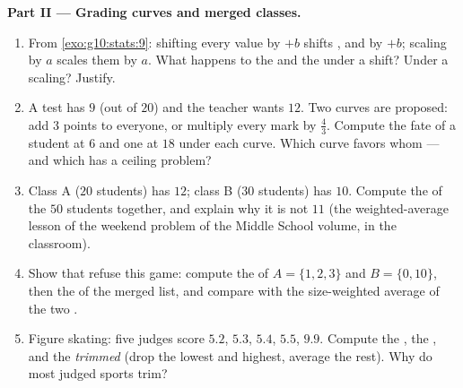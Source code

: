 \begin{problem}
\medskip
\noindent\textbf{Part II --- Grading curves and merged classes.}
\begin{enumerate}[resume]
  \item From \cref{exo:g10:stats:9}: shifting every value by
        $+b$ shifts ,  and  by $+b$; scaling
        by $a$ scales them by $a$. What happens to the  and
        the  under a shift? Under a scaling?
        Justify.
  \item A test has  $9$ (out of $20$) and the teacher wants
         $12$. Two curves are proposed: add $3$ points to
        everyone, or multiply every mark by $\frac43$. Compute
        the fate of a student at $6$ and one at $18$ under each
        curve. Which curve favors whom --- and which has a
        ceiling problem?
  \item Class A ($20$ students) has  $12$; class B ($30$
        students) has  $10$. Compute the  of the $50$
        students together, and explain why it is not $11$
        (the weighted-average lesson of the  weekend problem of the Middle School volume, in
        the classroom).
  \item Show that  refuse this game: compute the 
        of $A = \{1, 2, 3\}$ and $B = \{0, 10\}$, then the
         of the merged list, and compare with the
        size-weighted average of the two .
  \item Figure skating: five judges score $5.2$, $5.3$, $5.4$,
        $5.5$, $9.9$. Compute the , the , and the
        \emph{trimmed } (drop the lowest and highest, average
        the rest). Why do most judged sports trim?
\end{enumerate}


\end{problem}

